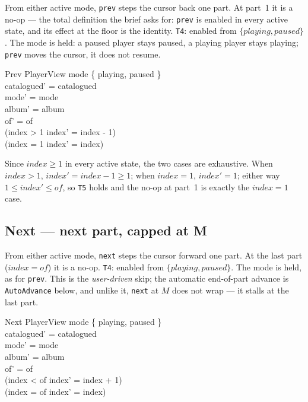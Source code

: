 \documentclass[a4paper,10pt,fleqn]{article}
\begin{document}
From either active mode, \texttt{prev} steps the cursor back one part. At part~1
it is a no-op --- the total definition the brief asks for: \texttt{prev} is
enabled in every active state, and its effect at the floor is the identity.
\texttt{T4}: enabled from $\{ playing, paused \}$. The mode is held: a paused
player stays paused, a playing player stays playing; \texttt{prev} moves the
cursor, it does not resume.

\begin{schema}{Prev}
  \Delta PlayerView
  \where
  mode \in \{ playing, paused \} \\
  catalogued' = catalogued \\
  mode' = mode \\
  album' = album \\
  of' = of \\
  (index > 1 \implies index' = index - 1) \\
  (index = 1 \implies index' = index)
\end{schema}

Since $index \geq 1$ in every active state, the two cases are exhaustive. When
$index > 1$, $index' = index - 1 \geq 1$; when $index = 1$, $index' = 1$; either
way $1 \leq index' \leq of$, so \texttt{T5} holds and the no-op at part~1 is
exactly the $index = 1$ case.

\subsection{Next --- next part, capped at M}
\label{sec:next}

From either active mode, \texttt{next} steps the cursor forward one part. At the
last part ($index = of$) it is a no-op. \texttt{T4}: enabled from
$\{ playing, paused \}$. The mode is held, as for \texttt{prev}. This is the
\emph{user-driven} skip; the automatic end-of-part advance is
\texttt{AutoAdvance} below, and unlike it, \texttt{next} at $M$ does not wrap ---
it stalls at the last part.

\begin{schema}{Next}
  \Delta PlayerView
  \where
  mode \in \{ playing, paused \} \\
  catalogued' = catalogued \\
  mode' = mode \\
  album' = album \\
  of' = of \\
  (index < of \implies index' = index + 1) \\
  (index = of \implies index' = index)
\end{schema}
\end{document}
